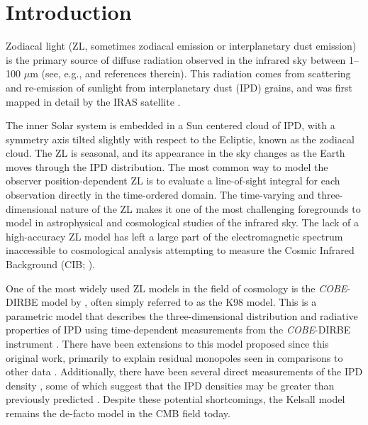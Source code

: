 \documentclass[twocolumn]{aa}
\begin{document}

   \maketitle

\setcounter{tocdepth}{2}
\tableofcontents
   

\section{Introduction}
Zodiacal light (ZL, sometimes zodiacal emission or interplanetary dust
emission) is the primary source of diffuse radiation observed in the
infrared sky between 1--100 $\mu$m (see, e.g., \citealp{Leinert1998}
and references therein). This radiation comes from scattering and
re-emission of sunlight from interplanetary dust (IPD) grains, and was
first mapped in detail by the IRAS satellite
\citep{neugebauer:1984}.

The inner Solar system is embedded in a Sun centered cloud of IPD,
with a symmetry axis tilted slightly with respect to the Ecliptic,
known as the zodiacal cloud. The ZL is seasonal, and its appearance in
the sky changes as the Earth moves through the IPD distribution. The
most common way to model the observer position-dependent ZL is to
evaluate a line-of-sight integral for each observation directly in the
time-ordered domain. The time-varying and three-dimensional nature of
the ZL makes it one of the most challenging foregrounds to model in
astrophysical and cosmological studies of the infrared sky. The lack
of a high-accuracy ZL model has left a large part of the
electromagnetic spectrum inaccessible to cosmological analysis
attempting to measure the Cosmic Infrared Background (CIB;
\citealp{partridge1967,hauser1998,hauser:2001}).

One of the most widely used ZL models in the field of cosmology is the
\textit{COBE}-DIRBE model by \citet{Kelsall1998}, often simply
referred to as the K98 model. This is a parametric model that describes 
the three-dimensional distribution and radiative 
properties of IPD using time-dependent measurements from
the \textit{COBE}-DIRBE instrument \citep{hauser1998}. There have been extensions to this model proposed since this original work, primarily to explain residual monopoles seen in comparisons to other data \citep{sano, Korngut,  skysurf}. Additionally, there have been several direct measurements of the IPD density \citep{newhorizons, parker}, some of which suggest that the IPD densities may be greater than previously predicted \citep{pioneer}. Despite these potential shortcomings, the Kelsall model remains the de-facto model in the CMB field today.
\end{document}
